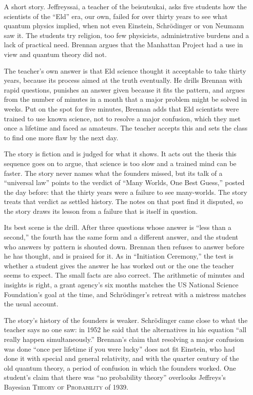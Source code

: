 \begin{afterword}
\summaryhead

A short story. Jeffreyssai, a teacher of the beisutsukai, asks five students how the scientists of the ``Eld'' era, our own, failed for over thirty years to see what quantum physics implied, when not even Einstein, Schrödinger or von Neumann saw it. The students try religion, too few physicists, administrative burdens and a lack of practical need. Brennan argues that the Manhattan Project had a use in view and quantum theory did not.

The teacher's own answer is that Eld science thought it acceptable to take thirty years, because its process aimed at the truth eventually. He drills Brennan with rapid questions, punishes an answer given because it fits the pattern, and argues from the number of minutes in a month that a major problem might be solved in weeks. Put on the spot for five minutes, Brennan adds that Eld scientists were trained to use known science, not to resolve a major confusion, which they met once a lifetime and faced as amateurs. The teacher accepts this and sets the class to find one more flaw by the next day.

\responsehead

The story is fiction and is judged for what it shows. It acts out the thesis this sequence goes on to argue, that science is too slow and a trained mind can be faster. The story never names what the founders missed, but its talk of a ``universal law'' points to the verdict of ``Many Worlds, One Best Guess,'' posted the day before: that the thirty years were a failure to see many-worlds. The story treats that verdict as settled history. The notes on that post find it disputed, so the story draws its lesson from a failure that is itself in question.

Its best scene is the drill. After three questions whose answer is ``less than a second,'' the fourth has the same form and a different answer, and the student who answers by pattern is shouted down. Brennan then refuses to answer before he has thought, and is praised for it. As in ``Initiation Ceremony,'' the test is whether a student gives the answer he has worked out or the one the teacher seems to expect. The small facts are also correct. The arithmetic of minutes and insights is right, a grant agency's six months matches the US National Science Foundation's goal at the time, and Schrödinger's retreat with a mistress matches the usual account.

The story's history of the founders is weaker. Schrödinger came close to what the teacher says no one saw: in 1952 he said that the alternatives in his equation ``all really happen simultaneously.'' Brennan's claim that resolving a major confusion was done ``once per lifetime if you were lucky'' does not fit Einstein, who had done it with special and general relativity, and with the quarter century of the old quantum theory, a period of confusion in which the founders worked. One student's claim that there was ``no probability theory'' overlooks Jeffreys's Bayesian \textsc{Theory of Probability} of 1939.


\end{afterword}
